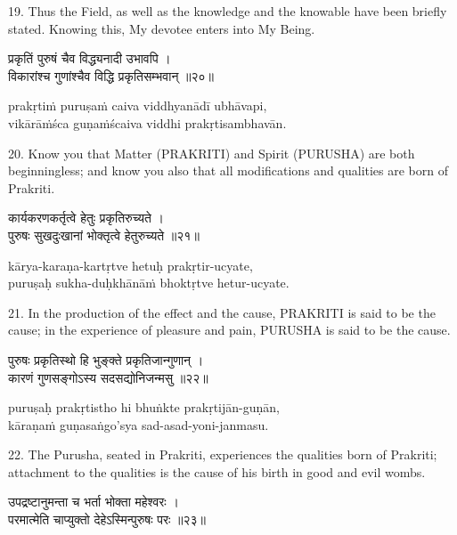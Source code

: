 19. Thus the Field, as well as the knowledge and the knowable have been briefly
stated. Knowing this, My devotee enters into My Being.

\begin{gitaverse}
प्रकृतिं पुरुषं चैव विद्ध्यनादी उभावपि । \\
विकारांश्च गुणांश्चैव विद्धि प्रकृतिसम्भवान् ॥२०॥
\end{gitaverse}

\begin{transliteration}
prakṛtiṁ puruṣaṁ caiva viddhyanādī ubhāvapi, \\
vikārāṁśca guṇaṁścaiva viddhi prakṛtisambhavān.
\end{transliteration}

20. Know you that Matter (PRAKRITI) and Spirit (PURUSHA) are both
beginningless; and know you also that all modifications and qualities are born
of Prakriti.

\begin{gitaverse}
कार्यकरणकर्तृत्वे हेतुः प्रकृतिरुच्यते । \\
पुरुषः सुखदुःखानां भोक्तृत्वे हेतुरुच्यते ॥२१॥
\end{gitaverse}

\begin{transliteration}
kārya-karaṇa-kartṛtve hetuḥ prakṛtir-ucyate, \\
puruṣaḥ sukha-duḥkhānāṁ bhoktṛtve hetur-ucyate.
\end{transliteration}

21. In the production of the effect and the cause, PRAKRITI is said to be the
cause; in the experience of pleasure and pain, PURUSHA is said to be the cause.

\begin{gitaverse}
पुरुषः प्रकृतिस्थो हि भुङ्क्ते प्रकृतिजान्गुणान् । \\
कारणं गुणसङ्गोऽस्य सदसद्योनिजन्मसु ॥२२॥
\end{gitaverse}

\begin{transliteration}
puruṣaḥ prakṛtistho hi bhuṅkte prakṛtijān-guṇān, \\
kāraṇaṁ guṇasaṅgo'sya sad-asad-yoni-janmasu.
\end{transliteration}

22. The Purusha, seated in Prakriti, experiences the qualities born of
Prakriti; attachment to the qualities is the cause of his birth in good and
evil wombs.

\begin{gitaverse}
उपद्रष्टानुमन्ता च भर्ता भोक्ता महेश्वरः । \\
परमात्मेति चाप्युक्तो देहेऽस्मिन्पुरुषः परः ॥२३॥
\end{gitaverse}


